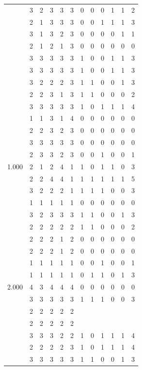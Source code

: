 \documentclass[]{book}
\theoremstyle{definition}
\theoremstyle{definition}
\theoremstyle{definition}
\theoremstyle{remark}
\begin{document}
\begin{table}
{\begin{tabular}[t]{rrrrrrrrrrrr}
 & 3 & 2 & 3 & 3 & 3 & 0 & 0 & 0 & 1 & 1 & 2\\
 & 2 & 1 & 3 & 3 & 3 & 0 & 0 & 1 & 1 & 1 & 3\\
 & 3 & 1 & 3 & 2 & 3 & 0 & 0 & 0 & 0 & 1 & 1\\
 & 2 & 1 & 2 & 1 & 3 & 0 & 0 & 0 & 0 & 0 & 0\\
 & 3 & 3 & 3 & 3 & 3 & 1 & 0 & 0 & 1 & 1 & 3\\
 & 3 & 3 & 3 & 3 & 3 & 1 & 0 & 0 & 1 & 1 & 3\\
 & 3 & 2 & 2 & 2 & 3 & 1 & 1 & 0 & 0 & 1 & 3\\
 & 2 & 2 & 3 & 1 & 3 & 1 & 1 & 0 & 0 & 0 & 2\\
 & 3 & 3 & 3 & 3 & 3 & 1 & 0 & 1 & 1 & 1 & 4\\
 & 1 & 1 & 3 & 1 & 4 & 0 & 0 & 0 & 0 & 0 & 0\\
 & 2 & 2 & 3 & 2 & 3 & 0 & 0 & 0 & 0 & 0 & 0\\
 & 3 & 3 & 3 & 3 & 3 & 0 & 0 & 0 & 0 & 0 & 0\\
 & 2 & 3 & 3 & 2 & 3 & 0 & 0 & 1 & 0 & 0 & 1\\
1.000 & 2 & 1 & 2 & 4 & 1 & 1 & 0 & 1 & 1 & 0 & 3\\
 & 2 & 2 & 4 & 4 & 1 & 1 & 1 & 1 & 1 & 1 & 5\\
 & 3 & 2 & 2 & 2 & 1 & 1 & 1 & 1 & 0 & 0 & 3\\
 & 1 & 1 & 1 & 1 & 1 & 0 & 0 & 0 & 0 & 0 & 0\\
 & 3 & 2 & 3 & 3 & 3 & 1 & 1 & 0 & 0 & 1 & 3\\
 & 2 & 2 & 2 & 2 & 2 & 1 & 1 & 0 & 0 & 0 & 2\\
 & 2 & 2 & 2 & 1 & 2 & 0 & 0 & 0 & 0 & 0 & 0\\
 & 2 & 2 & 2 & 1 & 2 & 0 & 0 & 0 & 0 & 0 & 0\\
 & 1 & 1 & 1 & 1 & 1 & 0 & 0 & 1 & 0 & 0 & 1\\
 & 1 & 1 & 1 & 1 & 1 & 0 & 1 & 1 & 0 & 1 & 3\\
2.000 & 4 & 3 & 4 & 4 & 4 & 0 & 0 & 0 & 0 & 0 & 0\\
 & 3 & 3 & 3 & 3 & 3 & 1 & 1 & 1 & 0 & 0 & 3\\
 & 2 & 2 & 2 & 2 & 2 &  &  &  &  &  & \\
 & 2 & 2 & 2 & 2 & 2 &  &  &  &  &  & \\
 & 3 & 3 & 3 & 2 & 2 & 1 & 0 & 1 & 1 & 1 & 4\\
 & 2 & 2 & 2 & 2 & 3 & 1 & 0 & 1 & 1 & 1 & 4\\
 & 3 & 3 & 3 & 3 & 3 & 1 & 1 & 0 & 0 & 1 & 3\\

\end{tabular}}
\end{table}
\end{document}
